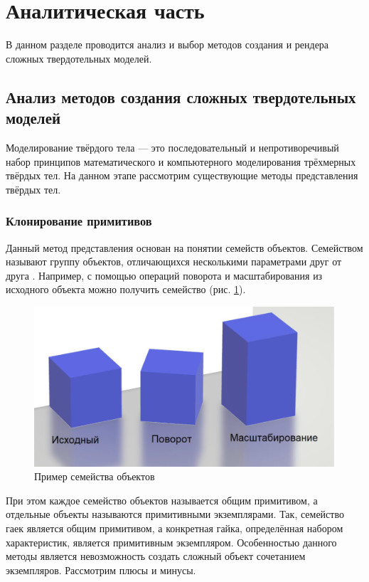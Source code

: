\section{Аналитическая часть}

В данном разделе проводится анализ и выбор методов создания и рендера 
сложных твердотельных моделей.

\subsection{Анализ методов создания сложных твердотельных моделей}

Моделирование твёрдого тела --- это последовательный и 
непротиворечивый набор принципов математического и компьютерного 
моделирования трёхмерных твёрдых тел. 
На данном этапе рассмотрим 
существующие методы представления твёрдых тел.

\subsubsection{Клонирование примитивов}

Данный метод представления основан на понятии семейств объектов. 
Семейством называют группу объектов, отличающихся несколькими 
параметрами друг от друга \cite{cloning}.
Например, с помощью операций поворота и 
масштабирования из исходного объекта можно получить семейство (рис. \ref{fig:primitiveClone}).

\begin{figure}[h]
	\centering
	\includegraphics[width=\textwidth]{img/primitiveClone.png}
	\caption{Пример семейства объектов}
	\label{fig:primitiveClone}
\end{figure}

При этом каждое семейство объектов называется общим примитивом, а 
отдельные объекты называются примитивными экземплярами. 
Так, семейство гаек является общим примитивом, а конкретная гайка, определённая набором характеристик, является примитивным экземпляром.
Особенностью данного методы является невозможность создать сложный 
объект сочетанием экземпляров. 
Рассмотрим плюсы и минусы. 

